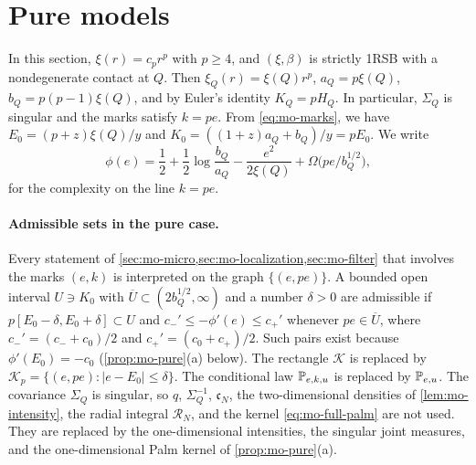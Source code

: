 \section{Pure models}\label{sec:mo-pure}

In this section, $\xi(r)=c_pr^p$ with $p\ge4$, and $(\xi,\beta)$ is strictly 1RSB with a nondegenerate contact at $Q$. Then $\xi_Q(r)=\xi(Q)r^p$, $a_Q=p\xi(Q)$, $b_Q=p(p-1)\xi(Q)$, and by Euler's identity $K_Q=pH_Q$. In particular, $\Sigma_Q$ is singular and the marks satisfy $k=pe$. From \eqref{eq:mo-marks}, we have $E_0=(p+z)\xi(Q)/y$ and $K_0=((1+z)a_Q+b_Q)/y=pE_0$. We write
\begin{equation}\label{eq:mo-phi}
\phi(e)=\frac12+\frac12\log\frac{b_Q}{a_Q}-\frac{e^2}{2\xi(Q)}+\Omega\bigl(pe/b_Q^{1/2}\bigr),
\end{equation}
for the complexity on the line $k=pe$.

\paragraph{Admissible sets in the pure case.}
Every statement of \cref{sec:mo-micro,sec:mo-localization,sec:mo-filter} that involves the marks $(e,k)$ is interpreted on the graph $\{(e,pe)\}$. A bounded open interval $U\ni K_0$ with $\overline U\subset(2b_Q^{1/2},\infty)$ and a number $\delta>0$ are admissible if $p[E_0-\delta,E_0+\delta]\subset U$ and $c_-'\le-\phi'(e)\le c_+'$ whenever $pe\in\overline U$, where $c_-'=(c_-+c_0)/2$ and $c_+'=(c_0+c_+)/2$. Such pairs exist because $\phi'(E_0)=-c_0$ (\cref{prop:mo-pure}(a) below). The rectangle $\mathcal K$ is replaced by $\mathcal K_p=\{(e,pe):|e-E_0|\le\delta\}$. The conditional law $\mathbb P_{e,k,u}$ is replaced by $\mathbb P_{e,u}$. The covariance $\Sigma_Q$ is singular, so $q$, $\Sigma_Q^{-1}$, $\mathfrak c_N$, the two-dimensional densities of \cref{lem:mo-intensity}, the radial integral $\mathcal R_N$, and the kernel \eqref{eq:mo-full-palm} are not used. They are replaced by the one-dimensional intensities, the singular joint measures, and the one-dimensional Palm kernel of \cref{prop:mo-pure}(a).

